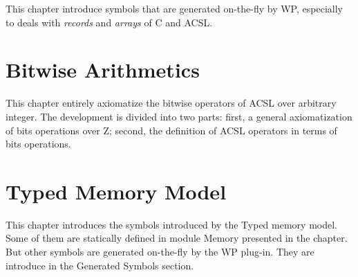\documentclass[web]{frama-c-book}
\begin{document}
This chapter introduce symbols that are generated on-the-fly by
\textsf{WP}, especially to deals with \textit{records} and
\textit{arrays} of \textsf{C} and \textsf{ACSL}.



\chapter{Bitwise Arithmetics}

This chapter entirely axiomatize the bitwise operators of
\textsf{ACSL} over arbitrary integer. The development is divided into
two parts: first, a general axiomatization of bits operations over
\textsf{Z}; second, the definition of \textsf{ACSL} operators in terms
of bits operations.




\chapter{Typed Memory Model}

This chapter introduces the symbols introduced by the \textsf{Typed}
memory model. Some of them are statically defined in module
\textsf{Memory} presented in the chapter. But other symbols are
generated on-the-fly by the \textsf{WP} plug-in. They are introduce in
the \textsf{Generated Symbols} section.



\end{document}
